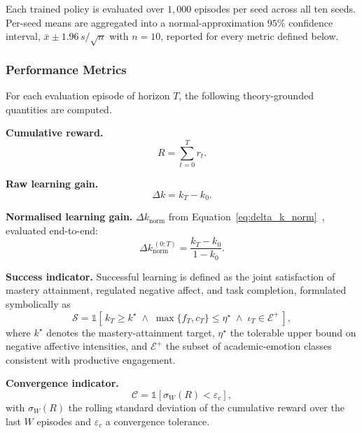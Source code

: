 Each trained policy is evaluated over $1{,}000$ episodes per seed across all ten seeds. Per-seed means are aggregated into a normal-approximation $95\%$ confidence interval, $\bar{x} \pm 1.96\,s/\sqrt{n}$ with $n=10$, reported for every metric defined below.


\subsubsection{Performance Metrics}\label{sec:method_eval}

For each evaluation episode of horizon $T$, the following theory-grounded quantities are computed.

\medskip
\noindent\textbf{Cumulative reward.}
\begin{equation}
R = \sum_{t=0}^{T} r_t.
\label{eq:metric_reward}
\end{equation}

\noindent\textbf{Raw learning gain.}
\begin{equation}
\Delta k = k_T - k_0.
\label{eq:metric_raw_gain}
\end{equation}

\noindent\textbf{Normalised learning gain.} $\Delta k_{\mathrm{norm}}$ from Equation~\eqref{eq:delta_k_norm}~\cite{hake_normalized_gain_1998}, evaluated end-to-end:
\begin{equation}
\Delta k_{\mathrm{norm}}^{\,(0{:}T)} = \frac{k_T - k_0}{1 - k_0}.
\label{eq:metric_norm_gain}
\end{equation}

\noindent\textbf{Success indicator.} Successful learning is defined as the joint satisfaction of mastery attainment, regulated negative affect, and task completion, formulated symbolically as
\begin{equation}
\mathcal{S} = \mathbb{1}\!\left[\, k_T \geq k^{\star} \;\wedge\; \max\{f_T, c_T\} \leq \eta^{\star} \;\wedge\; \iota_T \in \mathcal{E}^{+} \,\right],
\label{eq:metric_success}
\end{equation}
where $k^{\star}$ denotes the mastery-attainment target, $\eta^{\star}$ the tolerable upper bound on negative affective intensities, and $\mathcal{E}^{+}$ the subset of academic-emotion classes consistent with productive engagement.


\medskip
\noindent\textbf{Convergence indicator.}
\begin{equation}
\mathcal{C} = \mathbb{1}\!\left[\sigma_{W}(R) < \varepsilon_c\right],
\label{eq:metric_convergence}
\end{equation}
with $\sigma_{W}(R)$ the rolling standard deviation of the cumulative reward over the last $W$ episodes and $\varepsilon_c$ a convergence tolerance.

